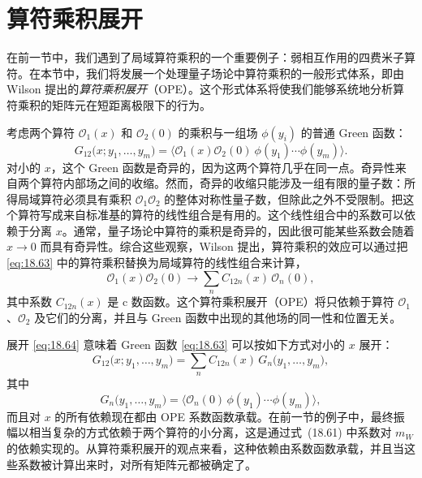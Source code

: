 \section{算符乘积展开}

在前一节中，我们遇到了局域算符乘积的一个重要例子：弱相互作用的四费米子算符。在本节中，我们将发展一个处理量子场论中算符乘积的一般形式体系，即由 Wilson 提出的\emph{算符乘积展开}（OPE）。这个形式体系将使我们能够系统地分析算符乘积的矩阵元在短距离极限下的行为。

考虑两个算符 $\mathcal{O}_1(x)$ 和 $\mathcal{O}_2(0)$ 的乘积与一组场 $\phi(y_i)$ 的普通 Green 函数：
\begin{equation}
  G_{12}\bigl( x; y_1, \ldots, y_m \bigr)
  = \bigl\langle \mathcal{O}_1(x)\mathcal{O}_2(0)\ \phi(y_1)\cdots\phi(y_m)
    \bigr\rangle .
  \label{eq:18.63}
\end{equation}
对小的 $x$，这个 Green 函数是奇异的，因为这两个算符几乎在同一点。奇异性来自两个算符内部场之间的收缩。然而，奇异的收缩只能涉及一组有限的量子数：所得局域算符必须具有乘积 $\mathcal{O}_1\mathcal{O}_2$ 的整体对称性量子数，但除此之外不受限制。把这个算符写成来自标准基的算符的线性组合是有用的。这个线性组合中的系数可以依赖于分离 $x$。通常，量子场论中算符的乘积是奇异的，因此很可能某些系数会随着 $x\to 0$ 而具有奇异性。综合这些观察，Wilson 提出，算符乘积的效应可以通过把 \eqref{eq:18.63} 中的算符乘积替换为局域算符的线性组合来计算，
\begin{equation}
  \mathcal{O}_1(x)\mathcal{O}_2(0) \to \sum_n C_{12n}(x)\,
    \mathcal{O}_n(0) ,
  \label{eq:18.64}
\end{equation}
其中系数 $C_{12n}(x)$ 是 c 数函数。这个算符乘积展开（OPE）将只依赖于算符 $\mathcal{O}_1$、$\mathcal{O}_2$ 及它们的分离，并且与 Green 函数中出现的其他场的同一性和位置无关。

展开 \eqref{eq:18.64} 意味着 Green 函数 \eqref{eq:18.63} 可以按如下方式对小的 $x$ 展开：
\begin{equation}
  G_{12}\bigl( x; y_1, \ldots, y_m \bigr) = \sum_n C_{12n}(x)\,
    G_n\bigl( y_1, \ldots, y_m \bigr) ,
  \label{eq:18.65}
\end{equation}
其中
\begin{equation}
  G_n\bigl( y_1, \ldots, y_m \bigr) = \bigl\langle \mathcal{O}_n(0)\,
    \phi(y_1)\cdots\phi(y_m) \bigr\rangle ,
  \label{eq:18.66}
\end{equation}
而且对 $x$ 的所有依赖现在都由 OPE 系数函数承载。在前一节的例子中，最终振幅以相当复杂的方式依赖于两个算符的小分离，这是通过式~(18.61) 中系数对 $m_W$ 的依赖实现的。从算符乘积展开的观点来看，这种依赖由系数函数承载，并且当这些系数被计算出来时，对所有矩阵元都被确定了。

